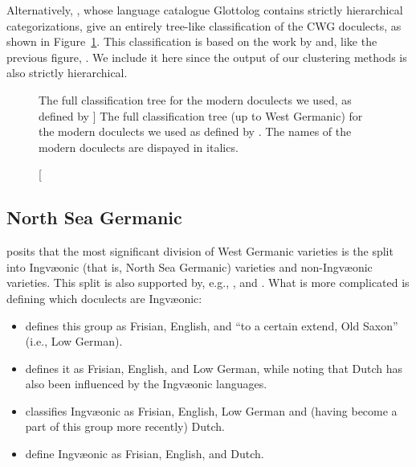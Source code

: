 \documentclass[a4paper]{article}
\begin{document}
Alternatively, \citet{hammarstroem2018glottolog},
whose language catalogue Glottolog contains strictly hierarchical categorizations,
give an entirely tree-like classification of the CWG doculects,
as shown in Figure~\ref{fig:glottolog}.
This classification is based on the work by \citet{stiles2013pan-west}
and, like the previous figure, \citet{harbert2007germanic}.
We include it here since the output of our clustering methods
is also strictly hierarchical.
\vspace{-0.6em}
\begin{figure}[H]
\begin{adjustwidth}{-10cm}{-10cm}
\centering
\scalebox{0.8}{

}
\end{adjustwidth}
% 
\caption
[
The full classification tree for the modern doculects we used,
as defined by \citet{hammarstroem2018glottolog}
]
{
The full classification tree (up to West Germanic) for the modern doculects we used
as defined by \citet{hammarstroem2018glottolog}.
The names of the modern doculects are dispayed in italics.
}
\label{fig:glottolog}
\end{figure}

\subsection{North Sea Germanic}

\citet{stiles2013pan-west} posits that
the most significant division of West Germanic varieties is
the split into Ingv\ae{}onic (that is, North Sea Germanic) varieties
and non-Ingv\ae{}onic varieties.
This split is also supported by, e.g., \citet[p. 7]{harbert2007germanic}, \citet[pp. 117--123]{sonderegger1979grundzuege} and \cite{auwera2017germanic}.
What is more complicated is defining which doculects are Ingv\ae{}onic:
\begin{itemize}
\item 
\citet{stiles2013pan-west} defines this group
as Frisian, English, and ``to a certain extend, Old Saxon'' (i.e., Low German).

\item
\citet[pp. 7--8, 17]{harbert2007germanic} defines it
as Frisian, English, and Low German,
while noting that Dutch has also been influenced by the Ingv\ae{}onic languages.

\item
\citet[pp. 71, 117--123]{sonderegger1979grundzuege} classifies Ingv\ae{}onic
as Frisian, English, Low German and (having become a part of this group more recently) Dutch.

\item
{} define Ingv\ae{}onic as Frisian, English, and Dutch.
\end{itemize}
\end{document}
